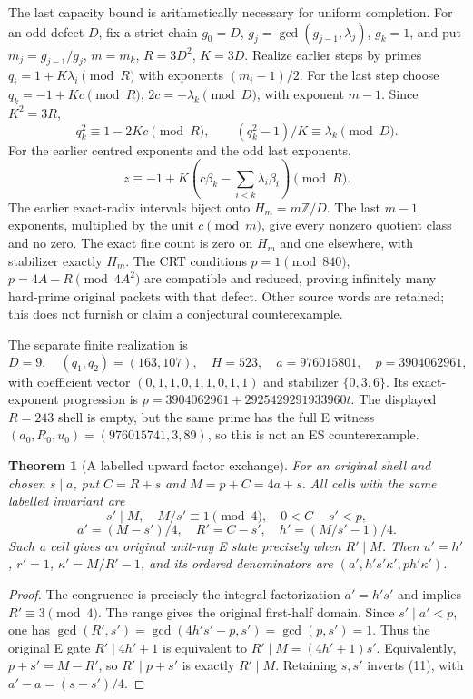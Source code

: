 \documentclass[10pt,reqno]{amsart}
\newtheorem{theorem}{Theorem}\newtheorem{proposition}[theorem]{Proposition}
\begin{document}
The last capacity bound is arithmetically necessary for uniform completion.
For an odd defect $D$, fix a strict chain
$g_0=D$, $g_j=\gcd(g_{j-1},\lambda_j)$, $g_k=1$, and put
$m_j=g_{j-1}/g_j$, $m=m_k$, $R=3D^2$, $K=3D$. Realize earlier steps by primes
$q_i=1+K\lambda_i\pmod R$ with exponents $(m_i-1)/2$. For the last step choose
$q_k=-1+Kc\pmod R$, $2c=-\lambda_k\pmod D$, with exponent $m-1$.
Since $K^2=3R$,
\[
 q_k^2\equiv1-2Kc\pmod R,\qquad (q_k^2-1)/K\equiv\lambda_k\pmod D.
\]
For the earlier centred exponents and the odd last exponents,
\[
 z\equiv-1+K\left(c\beta_k-\sum_{i<k}\lambda_i\beta_i\right)\pmod R.
\]
The earlier exact-radix intervals biject onto $H_m=m\mathbb Z/D$. The last
$m-1$ exponents, multiplied by the unit $c\pmod m$, give every nonzero quotient
class and no zero. The exact fine count is zero on $H_m$ and one elsewhere,
with stabilizer exactly $H_m$. The CRT conditions
$p=1\pmod{840}$, $p=4A-R\pmod{4A^2}$ are compatible and reduced, proving
infinitely many hard-prime original packets with that defect. Other source
words are retained; this does not furnish or claim a conjectural counterexample.

The separate finite realization is
\[
 D=9,\quad(q_1,q_2)=(163,107),\quad H=523,\quad
 a=976015801,\quad p=3904062961,
\]
with coefficient vector $(0,1,1,0,1,1,0,1,1)$ and stabilizer
$\{0,3,6\}$. Its exact-exponent progression is
$p=3904062961+2925429291933960t$. The displayed $R=243$ shell is empty, but
the same prime has the full E witness
$(a_0,R_0,u_0)=(976015741,3,89)$, so this is not an ES counterexample.

\begin{theorem}[A labelled upward factor exchange]
For an original shell and chosen $s\mid a$, put
$C=R+s$ and $M=p+C=4a+s$. All cells with the same labelled invariant are
\[
 s'\mid M,\quad M/s'\equiv1\pmod4,\quad 0<C-s'<p,
\]
\[
 a'=(M-s')/4,\quad R'=C-s',\quad h'=(M/s'-1)/4.                       \tag{11}
\]
Such a cell gives an original unit-ray E state precisely when $R'\mid M$.
Then $u'=h'$, $r'=1$, $\kappa'=M/R'-1$, and its ordered denominators are
$(a',h's'\kappa',ph'\kappa')$.
\end{theorem}
\begin{proof}
The congruence is precisely the integral factorization $a'=h's'$ and implies
$R'\equiv3\pmod4$. The range gives the original first-half domain. Since
$s'\mid a'<p$, one has
$\gcd(R',s')=\gcd(4h's'-p,s')=\gcd(p,s')=1$. Thus the original E gate
$R'\mid4h'+1$ is equivalent to $R'\mid M=(4h'+1)s'$. Equivalently,
$p+s'=M-R'$, so $R'\mid p+s'$ is exactly $R'\mid M$.
Retaining $s,s'$ inverts (11), with $a'-a=(s-s')/4$.
\end{proof}
\end{document}
